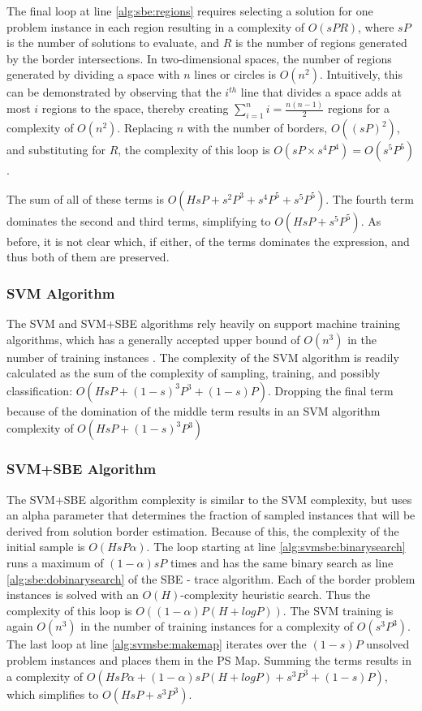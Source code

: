 The final loop at line \ref{alg:sbe:regions} requires selecting a solution for  one problem instance in each region resulting in a complexity of $O(sPR)$, where $sP$ is the number of solutions to evaluate, and $R$ is the number of regions generated by the border intersections.  In two-dimensional spaces, the number of regions generated by dividing a space with $n$ lines or circles is $O(n^2)$.  Intuitively, this can be demonstrated by observing that the $i^{th}$ line that divides a space adds at most $i$ regions to the space, thereby creating $\sum\nolimits_{i=1}^{n}i = \frac{n(n-1)}{2}$ regions for a complexity of $O(n^2)$.  Replacing $n$ with the number of borders, $O((sP)^2)$, and substituting for $R$, the complexity of this loop is $O(sP \times s^4P^4) = O(s^5P^5)$.

The sum of all of these terms is $O(HsP + s^2P^3 + s^4P^5 + s^5P^5)$.  The fourth term dominates the second and third terms, simplifying to  $O(HsP + s^5P^5)$.  As before, it is not clear which, if either, of the terms dominates the expression, and thus both of them are preserved.

\subsubsection{SVM Algorithm} The SVM and SVM+SBE algorithms rely heavily on support machine training algorithms, which has a generally accepted upper bound of $O(n^3)$ in the number of training instances \citep{bottou2007support,List09svm-optimization}.  The complexity of the SVM algorithm is readily calculated as the sum of the complexity of sampling, training, and possibly classification: $O(HsP + (1-s)^3P^3 + (1-s)P)$.  Dropping the final term because of the domination of the middle term results in an SVM algorithm complexity of $O(HsP + (1-s)^3P^3)$

\subsubsection{SVM+SBE Algorithm} The SVM+SBE algorithm complexity is similar to the SVM complexity, but uses an alpha parameter that determines the fraction of sampled instances that will be derived from solution border estimation.  Because of this, the complexity of the initial sample is $O(HsP\alpha)$.  The loop starting at line \ref{alg:svmsbe:binarysearch} runs a maximum of $(1-\alpha)sP$ times and has the same binary search as line \ref{alg:sbe:dobinarysearch} of the SBE - trace algorithm.  Each of the border problem instances is solved with an $O(H)$-complexity heuristic search.  Thus the complexity of this loop is $O((1-\alpha)P(H+logP))$.  The SVM training is again $O(n^3)$ in the number of training instances for a complexity of $O(s^3P^3)$.  The last loop at line \ref{alg:svmsbe:makemap} iterates over the $(1-s)P$ unsolved problem instances and places them in the PS Map.  Summing the terms results in a complexity of $O(HsP\alpha + (1-\alpha)sP(H+logP) + s^3P^3 + (1-s)P)$, which simplifies to  $O(HsP + s^3P^3)$.

